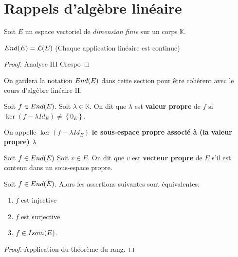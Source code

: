 \section{Rappels d'algèbre linéaire}

Soit $E$ un espace vectoriel de \textit{dimension finie} sur un corps
$\mathbb{K}$.

\begin{proposition}
	$End(E) = \mathcal{L}(E)$
	(Chaque application linéaire est continue)
\end{proposition}

\begin{proof}
	Analyse III Crespo
\end{proof}

On gardera la notation $End(E)$ dans cette section pour être
cohérent avec le cours d'algèbre linéaire II.

\begin{definition}
	\label{def:alg_lin_valeur_propre}
	Soit $f \in End(E)$.
	Soit $\lambda \in \mathbb{K}$.
	On dit que $\lambda$ est \textbf{valeur propre} de $f$ si $\ker(f - \lambda
		Id_{E}) \neq \left\{ 0_{E} \right\}$.
	
	On appelle $\ker(f - \lambda Id_{E})$ \textbf{le sous-espace propre associé
	à (la valeur propre) $\lambda$}
\end{definition}

\begin{definition}
	\label{def:alg_lin_vecteur_propre}
	Soit $f \in End(E)$
	Soit $v \in E$.
	On dit que $v$ est \textbf{vecteur propre} de $E$ s'il est contenu dans un
	sous-espace propre.
\end{definition}

\begin{proposition}
	Soit $f \in End(E)$.
	Alors les assertions suivantes sont équivalentes:

	\begin{enumerate}
		\item $f$ est injective
		\item $f$ est surjective
		\item $f \in Isom(E)$.
	\end{enumerate}
\end{proposition}

\begin{proof}
	Application du théorème du rang.
\end{proof}
